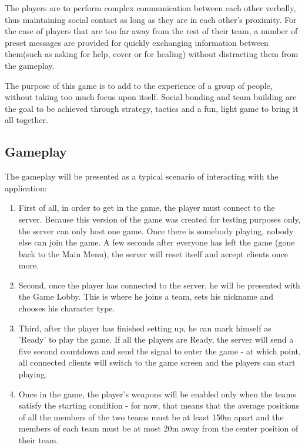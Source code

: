 \documentclass{article}
\begin{document}
The players are to perform complex communication between each other verbally,
thus maintaining social contact as long as they are in each other's proximity.
For the case of players that are too far away from the rest of their team, a
number of preset messages are provided for quickly exchanging information
between them(such as asking for help, cover or for healing) without distracting
them from the gameplay.\newline

The purpose of this game is to add to the experience of a group of people,
without taking too much focus upon itself. Social bonding and team building are
the goal to be achieved through strategy, tactics and a fun, light game to bring
it all together.\newline

\subsection{Gameplay}

The gameplay will be presented as a typical scenario of interacting with the
application:

\begin{enumerate}
  \item First of all, in order to get in the game, the player must connect to
  the server. Because this version of the game was created for testing purposes
  only, the server can only host one game. Once there is somebody playing,
  nobody else can join the game. A few seconds after everyone has left the game
  (gone back to the Main Menu), the server will reset itself and accept clients
  once more.
  
  \item Second, once the player has connected to the server, he will be
  presented with the Game Lobby. This is where he joins a team, sets his
  nickname and chooses his character type.

  \item Third, after the player has finished setting up, he can mark himself as
  'Ready' to play the game. If all the players are Ready, the server will send a
  five second countdown and send the signal to enter the game - at which point,
  all connected clients will switch to the game screen and the players can
  start playing.
  
  \item Once in the game, the player's weapons will be enabled only when the
  teams satisfy the starting condition - for now, that means that the average
  positions of all the members of the two teams must be at least 150m apart and
  the members of each team must be at most 20m away from the center position of
  their team.
 
\end{enumerate}
\end{document}
